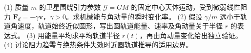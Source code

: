 (1) 质量 \(m\) 的卫星围绕引力参数 \(\mathcal G=GM\) 的固定中心天体运动，受到微弱线性阻力 \(\boldsymbol F_d=-\gamma\boldsymbol v\)，\(\gamma>0\)。求机械能与角动量的瞬时变化率。
(2) 假设 \(\gamma/m\) 远小于轨道角速度，轨道始终近似圆形，写出圆轨道能量、速率及角动量关于半径 \(r\) 的表达式。
(3) 用能量平均求平均轨道半径 \(r(t)\)，再由角动量变化给出独立验证。
(4) 讨论阻力趋零与绝热条件失效时近圆轨道推导的适用边界。

